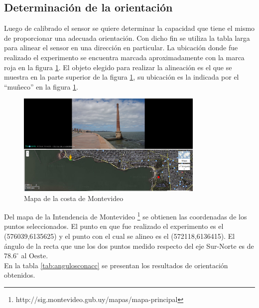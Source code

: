 \documentclass[main]{subfiles}
\begin{document}
\subsection{Determinaci\'on de la orientaci\'on}


Luego de calibrado el sensor se quiere determinar la capacidad que tiene el mismo de proporcionar una adecuada orientación. Con dicho fin se utiliza la tabla larga para alinear el sensor en una dirección en particular. La ubicación donde fue realizado el experimento se encuentra marcada aproximadamente con la marca roja en la figura \ref{fig:mapa}. El objeto elegido para realizar la alineación es el que se muestra en la parte superior de la figura \ref{fig:mapa}, su ubicación es la indicada por el ``mu\~neco'' en la figura \ref{fig:mapa}.
\begin{figure}
  \begin{center}
	\includegraphics[width=0.8\textwidth]
		{./pics_magneto/mapa.png}
	
  \end{center}
  \caption{Mapa de la costa de Montevideo}
  \label{fig:mapa}
\end{figure}

Del mapa de la Intendencia de Montevideo \footnote{http://sig.montevideo.gub.uy/mapas/mapa-principal} se obtienen las coordenadas de los puntos seleccionados. El punto en que fue realizado el experimento es el (576039,6135625) y el punto con el cual se alineo es el (572118,6136415). El ángulo de la recta que une los dos puntos medido respecto del eje Sur-Norte es de $78.6^\circ$ al Oeste.\\

En la tabla \ref{tab:angulosconacc} se presentan los resultados de orientaci\'on obtenidos.
\end{document}
